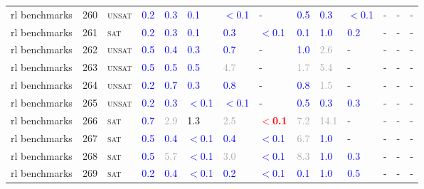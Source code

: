 \begin{center}
{\begin{longtable}{@{}llllllllllllll@{}}
rl benchmarks & 260 & \textsc{unsat} & \textcolor{blue}{0.2} & \textcolor{blue}{0.3} & \textcolor{blue}{0.1} & \textcolor{blue}{$<$0.1} & - & \textcolor{blue}{0.5} & \textcolor{blue}{0.3} & \textcolor{blue}{$<$0.1} & - & - & - \\
rl benchmarks & 261 & \textsc{sat} & \textcolor{blue}{0.2} & \textcolor{blue}{0.3} & \textcolor{blue}{0.1} & \textcolor{blue}{0.3} & \textcolor{blue}{$<$0.1} & \textcolor{blue}{0.1} & \textcolor{blue}{1.0} & \textcolor{blue}{0.2} & - & - & - \\
rl benchmarks & 262 & \textsc{unsat} & \textcolor{blue}{0.5} & \textcolor{blue}{0.4} & \textcolor{blue}{0.3} & \textcolor{blue}{0.7} & - & \textcolor{blue}{1.0} & \textcolor{darkgray}{2.6} & - & - & - & - \\
rl benchmarks & 263 & \textsc{unsat} & \textcolor{blue}{0.5} & \textcolor{blue}{0.5} & \textcolor{blue}{0.5} & \textcolor{darkgray}{4.7} & - & \textcolor{darkgray}{1.7} & \textcolor{darkgray}{5.4} & - & - & - & - \\
rl benchmarks & 264 & \textsc{unsat} & \textcolor{blue}{0.2} & \textcolor{blue}{0.7} & \textcolor{blue}{0.3} & \textcolor{blue}{0.8} & - & \textcolor{blue}{0.8} & \textcolor{darkgray}{1.5} & - & - & - & - \\
rl benchmarks & 265 & \textsc{unsat} & \textcolor{blue}{0.2} & \textcolor{blue}{0.3} & \textcolor{blue}{$<$0.1} & \textcolor{blue}{$<$0.1} & - & \textcolor{blue}{0.5} & \textcolor{blue}{0.3} & \textcolor{blue}{0.3} & - & - & - \\
rl benchmarks & 266 & \textsc{sat} & \textcolor{blue}{0.7} & \textcolor{darkgray}{2.9} & \textcolor{black}{1.3} & \textcolor{darkgray}{2.5} & \textbf{\textcolor{red}{$<$0.1}} & \textcolor{darkgray}{7.2} & \textcolor{darkgray}{14.1} & - & - & - & - \\
rl benchmarks & 267 & \textsc{sat} & \textcolor{blue}{0.5} & \textcolor{blue}{0.4} & \textcolor{blue}{$<$0.1} & \textcolor{blue}{0.4} & \textcolor{blue}{$<$0.1} & \textcolor{darkgray}{6.7} & \textcolor{blue}{1.0} & - & - & - & - \\
rl benchmarks & 268 & \textsc{sat} & \textcolor{blue}{0.5} & \textcolor{darkgray}{5.7} & \textcolor{blue}{$<$0.1} & \textcolor{darkgray}{3.0} & \textcolor{blue}{$<$0.1} & \textcolor{darkgray}{8.3} & \textcolor{blue}{1.0} & \textcolor{blue}{0.3} & - & - & - \\
rl benchmarks & 269 & \textsc{sat} & \textcolor{blue}{0.2} & \textcolor{blue}{0.4} & \textcolor{blue}{$<$0.1} & \textcolor{blue}{0.2} & \textcolor{blue}{$<$0.1} & \textcolor{blue}{0.1} & \textcolor{blue}{1.0} & \textcolor{blue}{0.5} & - & - & - \\

\end{longtable}}
\end{center}
